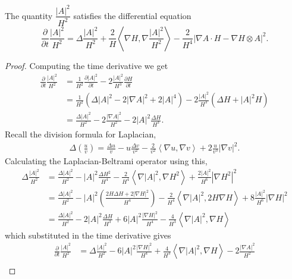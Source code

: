 \begin{lemma}\label{Deltag1}
    The quantity $ \dfrac{|A|^{2}}{H^{2}} $ satisfies the differential equation 
    \begin{equation}
        \frac{\partial}{ \partial t} \frac{|A|^{2}}{H^{2}} = \Delta \frac{|A|^{2}}{H^{2}}+ \frac{2}{H} \left< \nabla H , \nabla \frac{ |A|^{2}}{H^{2}}\right>  - \frac{2}{H^{4}}|\nabla A \cdot H - \nabla H \otimes A|^{2}. 
    \end{equation}
\end{lemma}
\begin{proof}
    Computing the time derivative we get 
    \begin{align*}
        \frac{\partial}{ \partial t} \frac{|A|^{2}}{H^{2}} & = \frac{1}{H^{2}} \frac{ \partial |A|^{2} }{ \partial t} - 2\frac{|A|^{2}}{H^{3}} \frac{ \partial H}{ \partial t}\\
        & = \frac{1}{H^{2}}\left( \Delta |A|^{2} - 2|\nabla A|^{2}+2|A|^{4}\right) - 2 \frac{|A|^{2}}{H^{3}}\left( \Delta  H + |A|^{2}H\right)\\
        & = \frac{\Delta |A|^{2}}{H^{2}} - 2 \frac{|\nabla A|^{2}}{H^{2}} - 2|A|^{2} \frac{\Delta H}{H^{3}} .
    \end{align*}
    Recall the division formula for Laplacian, \begin{align*}
        \Delta\left(\frac{u}{v}\right) = \frac{\Delta u}{v} - u \frac{\Delta v}{v^{2}} - \frac{2}{v^{2}}\left< \nabla u, \nabla v \right> + 2 \frac{u}{v^{3}}|\nabla v|^{2}.
    \end{align*}
    Calculating the Laplacian-Beltrami operator using this, \begin{align*}
        \Delta \frac{|A|^{2}}{H^{2}} & = \frac{\Delta |A|^{2}}{H^{2}} - |A|^{2}\frac{ \Delta H^{2}}{H^{4}} - \frac{2}{H^{4}} \left< \nabla |A|^{2}, \nabla H^{2} \right> + \frac{2|A|^{2}}{H^{6}}|\nabla H^{2}|^{2}\\
        & = \frac{\Delta |A|^{2}}{H^{2}} - |A|^{2} \left( \frac{2H \Delta H+ 2| \nabla H|^{2}}{H^{4}} \right)- \frac{2}{H^{4}}\left< \nabla |A|^{2}, 2H \nabla H \right> + 8 \frac{|A|^{2}}{H^{6}}|\nabla H|^{2}\\
        & = \frac{\Delta |A|^{2}}{{H^{2}}} - 2|A|^{2} \frac{\Delta H}{H^{3}} + 6|A|^{2} \frac{| \nabla H|^{2}}{H^{4}} - \frac{4}{H^{3}}\left< \nabla |A|^{2}, \nabla H \right>
    \end{align*}
    which substituted in the time derivative gives \begin{align*}
        \frac{\partial}{ \partial t} \frac{|A|^{2}}{H^{2}} & = \Delta \frac{|A|^{2}}{H^{2}}  - 6|A|^{2} \frac{| \nabla H|^{2}}{H^{4}} + \frac{4}{H^{3}}\left< \nabla |A|^{2}, \nabla H \right> -2 \frac{|\nabla A|^{2}}{H^{2}}\\

\end{align*}
\end{proof}
